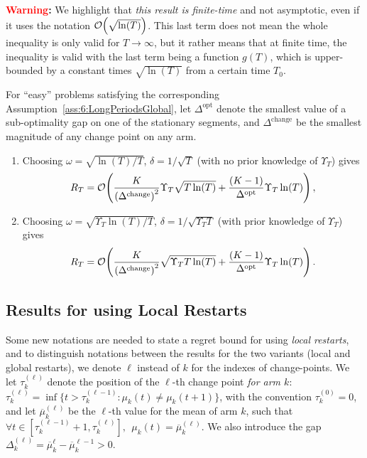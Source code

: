 \textbf{\textcolor{red}{Warning}:}
%
We highlight that \emph{this result is finite-time} and not asymptotic, even if it uses the notation $\mathop{}\mathopen{}\mathcal{O}\mathopen{}\left(\sqrt{\ln(T)}\right)$.
This last term does not mean the whole inequality is only valid for $T\to\infty$, but it rather means that at finite time, the inequality is valid with the last term being a function $g(T)$, which is upper-bounded by a constant times $\sqrt{\ln(T)}$ from a certain time $T_0$.

\begin{corollary}\label{cor:6:Global}
    For ``easy'' problems satisfying the corresponding Assumption~\ref{ass:6:LongPeriodsGlobal},
    let $\Delta^{\text{opt}}$ denote the smallest value of a sub-optimality gap on one of the stationary segments, and $\Delta^{\text{change}}$ be the smallest magnitude of any change point on any arm.
    \begin{enumerate}
        \item
        Choosing $\omega = \sqrt{\ln(T)/T}$, $\delta = 1/\sqrt{T}$ (with no prior knowledge of $\Upsilon_T$) gives
        \begin{equation}
            R_T = \mathop{}\mathopen{}\mathcal{O}\mathopen{}\left(\frac{K}{\left(\Delta^{\text{change}}\right)^2} \Upsilon_T\sqrt{T\ln(T)} + \frac{(K-1)}{\Delta^{\text{opt}}} \Upsilon_T\ln(T)\right),
        \end{equation}
        \item
        Choosing $\omega = \sqrt{\Upsilon_T\ln(T) / T}$, $\delta = 1 / \sqrt{\Upsilon_T T}$ (with prior knowledge of $\Upsilon_T$) gives
        \begin{equation}
            R_T = \mathop{}\mathopen{}\mathcal{O}\mathopen{}\left(\frac{K}{\left(\Delta^{\text{change}}\right)^2}\sqrt{\Upsilon_T T \ln(T)} + \frac{(K-1)}{\Delta^{\text{opt}}} \Upsilon_T\ln(T)\right).
        \end{equation}
    \end{enumerate}
\end{corollary}


\subsection{Results for \GLRklUCB{} using Local Restarts}

Some new notations are needed to state a regret bound for \GLRklUCB{} using \emph{local restarts},
and to distinguish notations between the results for the two variants (local and global restarts), we denote $\ell$ instead of $k$ for the indexes of change-points.
We let $\tau_k^{(\ell)}$ denote the position of the $\ell$-th change point \emph{for arm $k$}: $\tau_k^{(\ell)} = \inf \{ t > \tau_k^{(\ell - 1)} : \mu_k(t) \neq \mu_k(t+1)\}$,
with the convention $\tau_k^{(0)}=0$, and let $\overline{\mu}_k^{(\ell)}$ be the $\ell$-th value for the mean of arm $k$, such that $\forall t \in [\tau_k^{(\ell-1)}+1, \tau_k^{(\ell)}], \ \ \mu_k(t) = \overline{\mu}_k^{(\ell)}$.
We also introduce the gap $\Delta_k^{(\ell)} = \overline{\mu}_k^{\ell} - \overline{\mu}_k^{\ell-1} > 0$.

